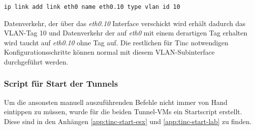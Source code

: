 \begin{lstlisting}
ip link add link eth0 name eth0.10 type vlan id 10
\end{lstlisting}

Datenverkehr, der über das \emph{eth0.10} Interface verschickt wird erhält dadurch das VLAN-Tag 10 und Datenverkehr der auf \emph{eth0} mit einem derartigen Tag erhalten wird taucht auf \emph{eth0.10} ohne Tag auf. Die restlichen für Tinc notwendigen Konfigurationsschritte können normal mit diesem VLAN-Subinterface durchgeführt werden.

\subsubsection{Script für Start der Tunnels}
Um die ansonsten manuell auszuführenden Befehle nicht immer von Hand eintippen zu müssen, wurde für die beiden Tunnel-VMs ein Startscript erstellt. Diese sind in den Anhängen \ref{app:tinc-start-esx} und \ref{app:tinc-start-lab} zu finden.
